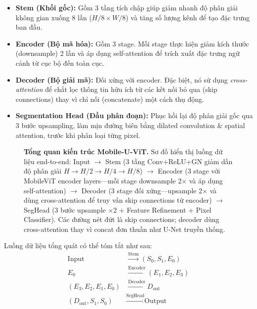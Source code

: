 \documentclass[conference]{IEEEtran}
\begin{document}
\begin{itemize}
    \item \textbf{Stem (Khối gốc):} Gồm 3 tầng tích chập giúp giảm nhanh độ phân giải không gian xuống 8 lần ($H/8 \times W/8$) và tăng số lượng kênh để tạo đặc trưng ban đầu.
    \item \textbf{Encoder (Bộ mã hóa):} Gồm 3 stage. Mỗi stage thực hiện giảm kích thước (downsample) 2 lần và áp dụng self-attention để trích xuất đặc trưng ngữ cảnh từ cục bộ đến toàn cục.
    \item \textbf{Decoder (Bộ giải mã):} Đối xứng với encoder. Đặc biệt, nó sử dụng \textit{cross-attention} để chắt lọc thông tin hữu ích từ các kết nối bỏ qua (skip connections) thay vì chỉ nối (concatenate) một cách thụ động.
    \item \textbf{Segmentation Head (Đầu phân đoạn):} Phục hồi lại độ phân giải gốc qua 3 bước upsampling, làm mịn đường biên bằng dilated convolution \& spatial attention, trước khi phân loại từng pixel.
\end{itemize}

\begin{figure}[t]
\centering
{}
\caption{\textbf{Tổng quan kiến trúc Mobile-U-ViT.} Sơ đồ hiển thị luồng dữ liệu end-to-end: Input $\rightarrow$ Stem (3 tầng Conv+ReLU+GN giảm dần độ phân giải $H \rightarrow H/2 \rightarrow H/4 \rightarrow H/8$) $\rightarrow$ Encoder (3 stage với MobileViT encoder layers---mỗi stage downsample 2$\times$ và áp dụng self-attention) $\rightarrow$ Decoder (3 stage đối xứng---upsample 2$\times$ và dùng cross-attention để truy vấn skip connections từ encoder) $\rightarrow$ SegHead (3 bước upsample $\times$2 + Feature Refinement + Pixel Classifier). Các đường nét đứt là skip connections; decoder dùng cross-attention thay vì concat đơn thuần như U-Net truyền thống.}
\label{fig:architecture}
\end{figure}

Luồng dữ liệu tổng quát có thể tóm tắt như sau:
\begin{equation}
\begin{aligned}
\text{Input} &\xrightarrow{\text{Stem}} (S_0, S_1, E_0) \\
E_0 &\xrightarrow{\text{Encoder}} (E_1, E_2, E_3) \\
(E_3, E_2, E_1, E_0) &\xrightarrow{\text{Decoder}} D_{\text{out}} \\
(D_{\text{out}}, S_1, S_0) &\xrightarrow{\text{SegHead}} \text{Output}
\end{aligned}
\end{equation}
\end{document}

